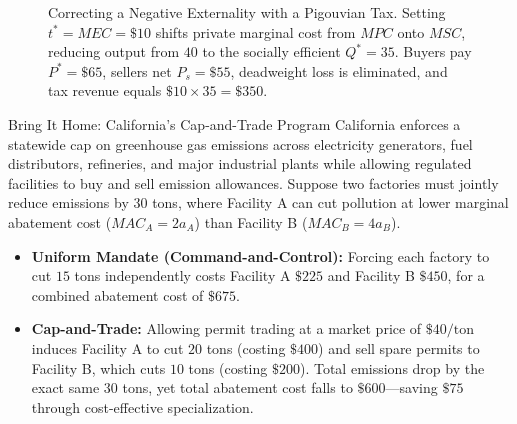 \documentclass[11pt,letterpaper]{article}
\begin{document}
\begin{figure}[htbp]
\caption{Correcting a Negative Externality with a Pigouvian Tax. Setting $t^* = MEC = \$10$ shifts private marginal cost from $MPC$ onto $MSC$, reducing output from $40$ to the socially efficient $Q^* = 35$. Buyers pay $P^* = \$65$, sellers net $P_s = \$55$, deadweight loss is eliminated, and tax revenue equals $\$10 \times 35 = \$350$.}
\label{fig:pigouvian_tax}
\end{figure}

\begin{examplecase}{Bring It Home: California's Cap-and-Trade Program}
California enforces a statewide cap on greenhouse gas emissions across electricity generators, fuel distributors, refineries, and major industrial plants while allowing regulated facilities to buy and sell emission allowances. Suppose two factories must jointly reduce emissions by $30$ tons, where Facility A can cut pollution at lower marginal abatement cost ($MAC_A = 2a_A$) than Facility B ($MAC_B = 4a_B$).
\begin{itemize}
    \item \textbf{Uniform Mandate (Command-and-Control):} Forcing each factory to cut $15$ tons independently costs Facility A $\$225$ and Facility B $\$450$, for a combined abatement cost of $\$675$.
    \item \textbf{Cap-and-Trade:} Allowing permit trading at a market price of $\$40/\text{ton}$ induces Facility A to cut $20$ tons (costing $\$400$) and sell spare permits to Facility B, which cuts $10$ tons (costing $\$200$). Total emissions drop by the exact same $30$ tons, yet total abatement cost falls to $\$600$—saving $\$75$ through cost-effective specialization.
\end{itemize}
\end{examplecase}
\end{document}
